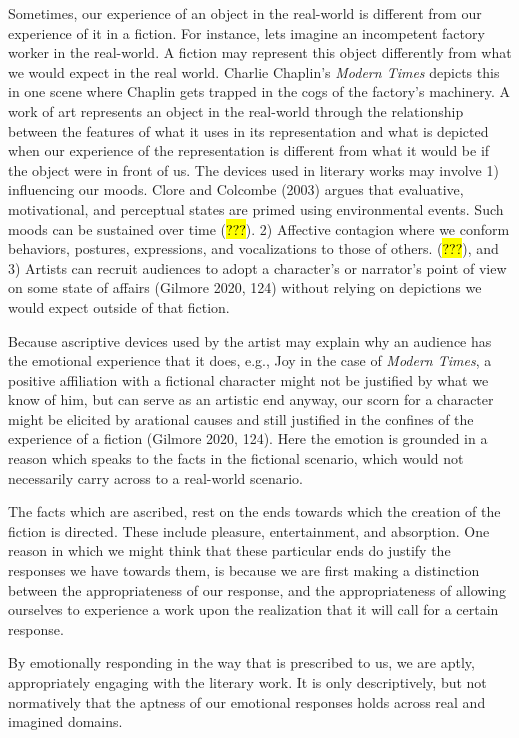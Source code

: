 \documentclass[
  letterpaper,
  DIV=11,
  numbers=noendperiod]{scrartcl}
\theoremstyle{remark}
\begin{document}
Sometimes, our experience of an object in the real-world is different
from our experience of it in a fiction. For instance, lets imagine an
incompetent factory worker in the real-world. A fiction may represent
this object differently from what we would expect in the real world.
Charlie Chaplin's \emph{Modern Times} depicts this in one scene where
Chaplin gets trapped in the cogs of the factory's machinery. A work of
art represents an object in the real-world through the relationship
between the features of what it uses in its representation and what is
depicted when our experience of the representation is different from
what it would be if the object were in front of us. The devices used in
literary works may involve 1) influencing our moods. Clore and Colcombe
(2003) argues that evaluative, motivational, and perceptual states are
primed using environmental events. Such moods can be sustained over time
(\hl{???}). 2) Affective contagion where we conform behaviors, postures,
expressions, and vocalizations to those of others. (\hl{???}), and 3)
Artists can recruit audiences to adopt a character's or narrator's point
of view on some state of affairs (Gilmore 2020, 124) without relying on
depictions we would expect outside of that fiction.

Because ascriptive devices used by the artist may explain why an
audience has the emotional experience that it does, e.g., Joy in the
case of \emph{Modern Times}, a positive affiliation with a fictional
character might not be justified by what we know of him, but can serve
as an artistic end anyway, our scorn for a character might be elicited
by arational causes and still justified in the confines of the
experience of a fiction (Gilmore 2020, 124). Here the emotion is
grounded in a reason which speaks to the facts in the fictional
scenario, which would not necessarily carry across to a real-world
scenario.

The facts which are ascribed, rest on the ends towards which the
creation of the fiction is directed. These include pleasure,
entertainment, and absorption. One reason in which we might think that
these particular ends do justify the responses we have towards them, is
because we are first making a distinction between the appropriateness of
our response, and the appropriateness of allowing ourselves to
experience a work upon the realization that it will call for a certain
response.

By emotionally responding in the way that is prescribed to us, we are
aptly, appropriately engaging with the literary work. It is only
descriptively, but not normatively that the aptness of our emotional
responses holds across real and imagined domains.
\end{document}
